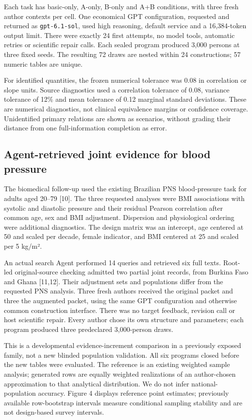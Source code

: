 \documentclass[11pt,letterpaper]{article}
\begin{document}
Each task has basic-only, A-only, B-only and A+B conditions, with three fresh author contexts per cell. One economical GPT configuration, requested and returned as \texttt{gpt-\allowbreak{}6.1-\allowbreak{}sol}, used high reasoning, default service and a 16,384-token output limit. There were exactly 24 first attempts, no model tools, automatic retries or scientific repair calls. Each sealed program produced 3,000 persons at three fixed seeds. The resulting 72 draws are nested within 24 constructions; 57 numeric tables are unique.


For identified quantities, the frozen numerical tolerance was 0.08 in correlation or slope units. Source diagnostics used a correlation tolerance of 0.08, variance tolerance of 12\% and mean tolerance of 0.12 marginal standard deviations. These are numerical diagnostics, not clinical equivalence margins or confidence coverage. Unidentified primary relations are shown as scenarios, without grading their distance from one full-information completion as error.


\subsection{Agent-retrieved joint evidence for blood pressure}

The biomedical follow-up used the existing Brazilian PNS blood-pressure task for adults aged 20–\allowbreak{}79 [10]. The three requested analyses were BMI associations with systolic and diastolic pressure and their residual Pearson correlation after common age, sex and BMI adjustment. Dispersion and physiological ordering were additional diagnostics. The design matrix was an intercept, age centered at 50 and scaled per decade, female indicator, and BMI centered at 25 and scaled per 5 kg/\allowbreak{}m².


An actual search Agent performed 14 queries and retrieved six full texts. Root-led original-source checking admitted two partial joint records, from Burkina Faso and Ghana [11,12]. Their adjustment sets and populations differ from the requested PNS analysis. Three fresh authors received the original packet and three the augmented packet, using the same GPT configuration and otherwise common construction interface. There was no target feedback, revision call or host scientific repair. Every author chose its own structure and parameters; each program produced three predeclared 3,000-person draws.


This is a developmental evidence-increment comparison in a previously exposed family, not a new blinded population validation. All six programs closed before the new tables were evaluated. The reference is an existing weighted sample analysis; generated rows are equally weighted realizations of an author-chosen approximation to that analytical distribution. We do not infer national-population accuracy. Figure 4 displays reference point estimates; previously available row-bootstrap intervals measure conditional sampling stability and are not design-based survey intervals.
\end{document}
